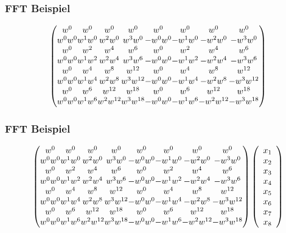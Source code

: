 \frame
{
	\frametitle{FFT Beispiel}
	\begin{equation*}
	\left( \begin{array}{*{8}{@{}c}@{}}
w^{0} & w^{0} & w^{0} & w^{0} & w^{0} & w^{0} & w^{0} & w^{0}\\
w^{0}w^{0} & w^{1}w^{0} & w^{2}w^{0} & w^{3}w^{0} & -w^{0}w^{0} & -w^{1}w^{0} & -w^{2}w^{0} & -w^{3}w^{0}\\
w^{0} & w^{2} & w^{4} & w^{6} & w^{0} & w^{2} & w^{4} & w^{6}\\
w^{0}w^{0} & w^{1}w^{2} & w^{2}w^{4} & w^{3}w^{6} & -w^{0}w^{0} & -w^{1}w^{2} & -w^{2}w^{4} & -w^{3}w^{6}\\
w^{0} & w^{4} & w^{8} & w^{12} & w^{0} & w^{4} & w^{8} & w^{12}\\
w^{0}w^{0} & w^{1}w^{4} & w^{2}w^{8} & w^{3}w^{12} & -w^{0}w^{0} & -w^{1}w^{4} & -w^{2}w^{8} & -w^{3}w^{12}\\
w^{0} & w^{6} & w^{12} & w^{18} & w^{0} & w^{6} & w^{12} & w^{18}\\
w^{0}w^{0} & w^{1}w^{6} & w^{2}w^{12} & w^{3}w^{18} & -w^{0}w^{0} & -w^{1}w^{6} & -w^{2}w^{12} & -w^{3}w^{18}\\
	\end{array} \right)
\end{equation*}
}

\frame
{
	\frametitle{FFT Beispiel}
	\begin{equation*}
	\left( \begin{array}{*{8}{@{}c}@{}}
w^{0} & w^{0} & w^{0} & w^{0} & w^{0} & w^{0} & w^{0} & w^{0}\\
w^{0}w^{0} & w^{1}w^{0} & w^{2}w^{0} & w^{3}w^{0} & -w^{0}w^{0} & -w^{1}w^{0} & -w^{2}w^{0} & -w^{3}w^{0}\\
w^{0} & w^{2} & w^{4} & w^{6} & w^{0} & w^{2} & w^{4} & w^{6}\\
w^{0}w^{0} & w^{1}w^{2} & w^{2}w^{4} & w^{3}w^{6} & -w^{0}w^{0} & -w^{1}w^{2} & -w^{2}w^{4} & -w^{3}w^{6}\\
w^{0} & w^{4} & w^{8} & w^{12} & w^{0} & w^{4} & w^{8} & w^{12}\\
w^{0}w^{0} & w^{1}w^{4} & w^{2}w^{8} & w^{3}w^{12} & -w^{0}w^{0} & -w^{1}w^{4} & -w^{2}w^{8} & -w^{3}w^{12}\\
w^{0} & w^{6} & w^{12} & w^{18} & w^{0} & w^{6} & w^{12} & w^{18}\\
w^{0}w^{0} & w^{1}w^{6} & w^{2}w^{12} & w^{3}w^{18} & -w^{0}w^{0} & -w^{1}w^{6} & -w^{2}w^{12} & -w^{3}w^{18}\\
	\end{array} \right)
	\left( \begin{array}{cccccccc}
x_1\\
x_2\\
x_3\\
x_4\\
x_5\\
x_6\\
x_7\\
x_8\\
\end{array} \right)
\end{equation*}
}



